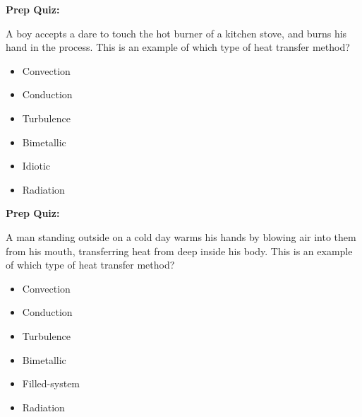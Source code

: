 \vfil \eject

\noindent
{\bf Prep Quiz:}

A boy accepts a dare to touch the hot burner of a kitchen stove, and burns his hand in the process.  This is an example of which type of heat transfer method?

\begin{itemize}
\item{} Convection
\vskip 5pt 
\item{} Conduction
\vskip 5pt 
\item{} Turbulence
\vskip 5pt 
\item{} Bimetallic
\vskip 5pt 
\item{} Idiotic
\vskip 5pt 
\item{} Radiation
\end{itemize}








\vfil \eject

\noindent
{\bf Prep Quiz:}

A man standing outside on a cold day warms his hands by blowing air into them from his mouth, transferring heat from deep inside his body.  This is an example of which type of heat transfer method?

\begin{itemize}
\item{} Convection
\vskip 5pt 
\item{} Conduction
\vskip 5pt 
\item{} Turbulence
\vskip 5pt 
\item{} Bimetallic
\vskip 5pt 
\item{} Filled-system
\vskip 5pt 
\item{} Radiation
\end{itemize}




